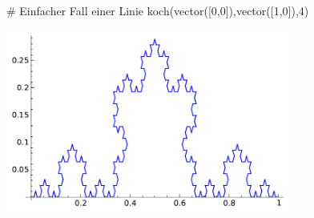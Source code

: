 \documentclass[fontsize=12pt,paper=a4,twoside,bibtotoc,idxtotoc,
liststotoc,pagesize,BCOR1.2cm,DIV15,chapterprefix,pagesize=pdftex]{scrbook}
\theoremstyle{plain}
\theoremstyle{definition}
\theoremstyle{remark}
\begin{document}
\begin{sagein}
# Einfacher Fall einer Linie 
koch(vector([0,0]),vector([1,0]),4)
\end{sagein}
\begin{center}
\includegraphics[width=0.7\textwidth]{koch.pdf} 
\end{center}
\end{document}

